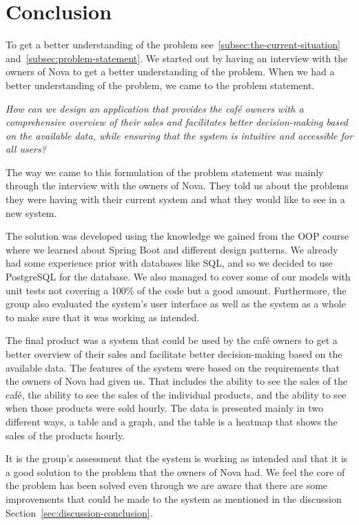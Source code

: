 \pagebreak
\section{Conclusion}\label{sec:conclusion}
To get a better understanding of the problem see~\ref{subsec:the-current-situation} and~\ref{subsec:problem-statement}.
We started out by having an interview with the owners of Nova to get a better understanding of the problem.
When we had a better understanding of the problem, we came to the problem statement.

\textit{How can we design an application that provides the café owners with a comprehensive overview of their sales and
facilitates better decision-making based on the available data, while ensuring that the system is intuitive and
accessible for all users?}

The way we came to this formulation of the problem statement was mainly through the interview with the owners of Nova.
They told us about the problems they were having with their current system and what they would like to see in a
new system.

The solution was developed using the knowledge we gained from the OOP course where we learned about Spring Boot and
different design patterns.
We already had some experience prior with databases like SQL, and so we decided to use PostgreSQL for the database.
We also managed to cover some of our models with unit tests not covering a 100\% of the code but a good amount.
Furthermore, the group also evaluated the system's user interface as well as the system as a whole to make sure that it
was working as intended.

The final product was a system that could be used by the café owners to get a better overview of their sales and
facilitate better decision-making based on the available data.
The features of the system were based on the requirements that the owners of Nova had given us.
That includes the ability to see the sales of the café, the ability to see the sales of the individual products, and the
ability to see when those products were sold hourly.
The data is presented mainly in two different ways, a table and a graph, and the table is a heatmap that shows the sales
of the products hourly.

It is the group's assessment that the system is working as intended
and that it is a good solution to the problem that the owners of Nova had.
We feel the core of the problem has been solved even through we are aware that there are some improvements that could
be made to the system as mentioned in the discussion Section~\ref{sec:discussion-conclusion}.
